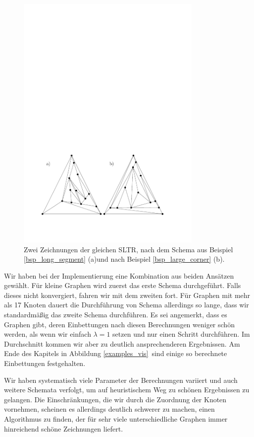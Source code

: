 \begin{figure}
	\centering
  \includegraphics[width=0.8\textwidth]{ex_large_corner.pdf}
  \caption{Zwei Zeichnungen der gleichen SLTR, nach dem Schema aus Beispiel \ref{bsp_long_segment} (a)und nach Beispiel \ref{bsp_large_corner} (b).}
  \label{large_corner}
\end{figure}

Wir haben bei der Implementierung eine Kombination aus beiden Ansätzen gewählt. Für kleine Graphen wird zuerst das erste Schema durchgeführt. Falls dieses nicht konvergiert, fahren wir mit dem zweiten fort. Für Graphen mit mehr als 17 Knoten dauert die Durchführung von Schema allerdings so lange, dass wir standardmäßig das zweite Schema durchführen. Es sei angemerkt, dass es Graphen gibt, deren Einbettungen nach diesen Berechnungen weniger schön werden, als wenn wir einfach $\lambda=1$ setzen und nur einen Schritt durchführen. Im Durchschnitt kommen wir aber zu deutlich ansprechenderen Ergebnissen. Am Ende des Kapitels in Abbildung \ref{examples_vis} sind einige so berechnete Einbettungen festgehalten.

\begin{remark}
Wir haben systematisch viele Parameter der Berechnungen variiert und auch weitere Schemata verfolgt, um auf heuristischem Weg zu schönen Ergebnissen zu gelangen. Die Einschränkungen, die wir durch die Zuordnung der Knoten vornehmen, scheinen es allerdings deutlich schwerer zu machen, einen Algorithmus zu finden, der für sehr viele unterschiedliche Graphen immer hinreichend schöne Zeichnungen liefert.
\end{remark}

